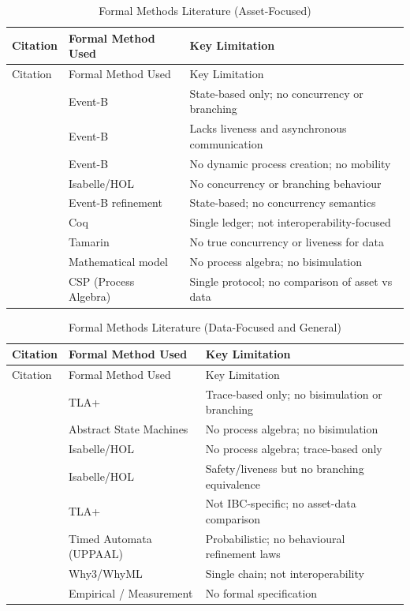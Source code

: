 \begin{longtable}[]{@{}lll@{}}
\caption{Formal Methods Literature (Asset-Focused)}\tabularnewline
\toprule\noalign{}
Citation & Formal Method Used & Key Limitation \\
\midrule\noalign{}
\endfirsthead
\toprule\noalign{}
Citation & Formal Method Used & Key Limitation \\
\midrule\noalign{}
\endhead
\bottomrule\noalign{}
\endlastfoot
\citep{Llambas2025} & Event-B & State-based only; no concurrency or
branching \\
\citep{Llambas2024patterns} & Event-B & Lacks liveness and asynchronous
communication \\
\citep{Llambas2024eventb} & Event-B & No dynamic process creation; no
mobility \\
\citep{lochbihler2020} & Isabelle/HOL & No concurrency or branching
behaviour \\
\citep{maric2025} & Event-B refinement & State-based; no concurrency
semantics \\
\citep{rupic2020} & Coq & Single ledger; not interoperability-focused \\
\citep{boyd2020} & Tamarin & No true concurrency or liveness for data \\
\citep{silva2025} & Mathematical model & No process algebra; no
bisimulation \\
\citep{Wang_2024} & CSP (Process Algebra) & Single protocol; no
comparison of asset vs data \\
\end{longtable}

\begin{longtable}[]{@{}lll@{}}
\caption{Formal Methods Literature (Data-Focused and
General)}\tabularnewline
\toprule\noalign{}
Citation & Formal Method Used & Key Limitation \\
\midrule\noalign{}
\endfirsthead
\toprule\noalign{}
Citation & Formal Method Used & Key Limitation \\
\midrule\noalign{}
\endhead
\bottomrule\noalign{}
\endlastfoot
\citep{Wei_2023} & TLA+ & Trace-based only; no bisimulation or
branching \\
\citep{lu2024atomicity} & Abstract State Machines & No process algebra;
no bisimulation \\
\citep{kammuller2020} & Isabelle/HOL & No process algebra; trace-based
only \\
\citep{kim2026} & Isabelle/HOL & Safety/liveness but no branching
equivalence \\
\citep{braithwaite2020} & TLA+ & Not IBC-specific; no asset-data
comparison \\
\citep{Alam_2023} & Timed Automata (UPPAAL) & Probabilistic; no
behavioural refinement laws \\
\citep{horta2020} & Why3/WhyML & Single chain; not interoperability \\
\citep{Chervinski_2023} & Empirical / Measurement & No formal
specification \\
\end{longtable}

